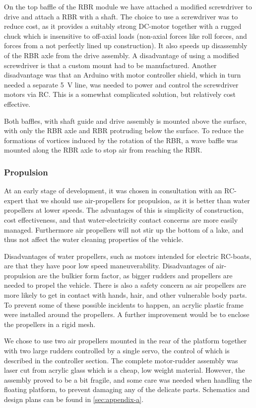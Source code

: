 On the top baffle of the RBR module we have attached a modified screwdriver to
drive and attach a RBR with a shaft. The choice to use a screwdriver was to
reduce cost, as it provides a suitably strong DC-motor together with a rugged
chuck which is insensitive to off-axial loads (non-axial forces like roll
forces, and forces from a not perfectly lined up construction). It also
speeds up disassembly of the RBR axle from the drive assembly.
A disadvantage of using a modified screwdriver is that a custom mount had
to be manufactured. Another disadvantage was that an Arduino with motor
controller shield, which in turn needed a separate 5~V line, was needed to power
and control the screwdriver motors via RC. This is a somewhat complicated solution,
but relatively cost effective.

Both baffles, with shaft guide and drive assembly is mounted above the surface,
with only the RBR axle and RBR protruding below the surface. To reduce the
formations of vortices induced by the rotation of the RBR, a wave baffle
was mounted along the RBR axle to stop air from reaching the RBR.

\subsubsection{Propulsion}
At an early stage of development, it was chosen in consultation with an
RC-expert that we should use air-propellers for propulsion, as it is better
than water propellers at lower speeds. The advantages of this is simplicity of
construction, cost effectiveness, and that water-electricity contact concerns
are more easily managed. Furthermore air propellers will not stir up the bottom
of a lake, and thus not affect the water cleaning properties of the vehicle.

Disadvantages of water propellers, such as motors intended for electric
RC-boats, are that they have poor low speed maneuverability. Disadvantages of
air-propulsion are the bulkier form factor, as bigger rudders and propellers
are needed to propel the vehicle. There is also a safety concern as air
propellers are more likely to get in contact with hands, hair, and other
vulnerable body parts. To prevent some of these possible incidents to happen,
an acrylic plastic frame were installed around the propellers.
A further improvement would be to enclose the propellers in a rigid mesh.

We chose to use two air propellers mounted in the rear of the platform together
with two large rudders controlled by a single servo, the control of which is
described in the controller section. The complete motor-rudder assembly was
laser cut from acrylic glass which is a cheap, low weight material. However,
the assembly proved to be a bit fragile, and some care was needed when
handling the floating platform, to prevent damaging any of the delicate
parts. Schematics and design plans can be found in \cref{sec:appendix-a}.

